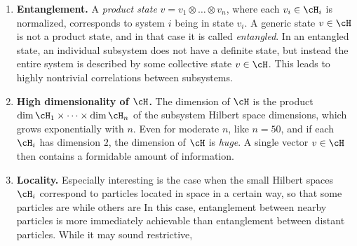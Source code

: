 \begin{enumerate}
    \item \textbf{Entanglement.} A \emph{product state} $v = v_1 \otimes \dots \otimes v_n$, where each $v_i \in \cH_i$ is normalized, corresponds to system $i$ being in state $v_i$. A generic state $v \in \cH$ is not a product state, and in that case it is called \emph{entangled}. In an entangled state, an individual subsystem does not have a definite state, but instead the entire system is described by some collective state $v \in \cH$. This leads to highly nontrivial correlations between subsystems.
    
    \item \textbf{High dimensionality of $\cH$.} The dimension of $\cH$ is the product $\dim \cH_1 \times \dots \times \dim \cH_n$ of the subsystem Hilbert space dimensions, which grows exponentially with $n$. Even for moderate $n$, like $n = 50$, and if each $\cH_i$ has dimension $2$, the dimension of $\cH$ is \emph{huge}. A single vector $v \in \cH$ then contains a formidable amount of information.
    
    \item \textbf{Locality.} Especially interesting is the case when the small Hilbert spaces $\cH_i$ correspond to particles located in space in a certain way, so that some particles are  while others are  In this case, entanglement between nearby particles is more immediately achievable than entanglement between distant particles. While it may sound restrictive, 
\end{enumerate}


